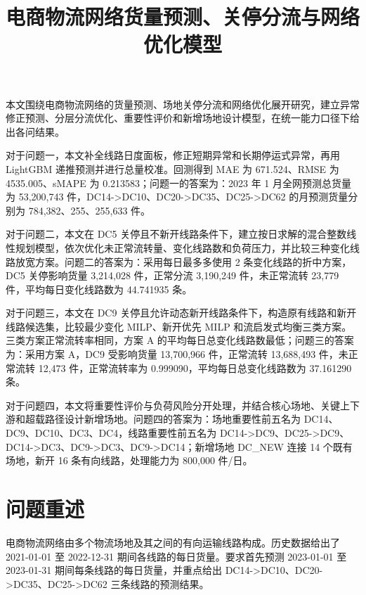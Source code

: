 \documentclass[UTF8,zihao=-4,a4paper,fontset=fandol]{ctexart}
\title{电商物流网络货量预测、关停分流与网络优化模型}
\author{}
\date{}
\begin{document}
\maketitle

\begin{cumcmabstract}
\hspace{2em}本文围绕电商物流网络的货量预测、场地关停分流和网络优化展开研究，建立异常修正预测、分层分流优化、重要性评价和新增场地设计模型，在统一能力口径下给出各问结果。

对于问题一，本文补全线路日度面板，修正短期异常和长期停运式异常，再用 LightGBM 递推预测并进行总量校准。回测得到 MAE 为 671.524、RMSE 为 4535.005、sMAPE 为 0.213583；问题一的答案为：2023 年 1 月全网预测总货量为 53,200,743 件，DC14->DC10、DC20->DC35、DC25->DC62 的月预测货量分别为 784,382、255、255,633 件。

对于问题二，本文在 DC5 关停且不新开线路条件下，建立按日求解的混合整数线性规划模型，依次优化未正常流转量、变化线路数和负荷压力，并比较三种变化线路放宽方案。问题二的答案为：采用每日最多多使用 2 条变化线路的折中方案，DC5 关停影响货量 3,214,028 件，正常分流 3,190,249 件，未正常流转 23,779 件，平均每日变化线路数为 44.741935 条。

对于问题三，本文在 DC9 关停且允许动态新开线路条件下，构造原有线路和新开线路候选集，比较最少变化 MILP、新开优先 MILP 和流启发式均衡三类方案。三类方案正常流转率相同，方案 A 的平均每日总变化线路数最低；问题三的答案为：采用方案 A，DC9 受影响货量 13,700,966 件，正常流转 13,688,493 件，未正常流转 12,473 件，正常流转率为 0.999090，平均每日总变化线路数为 37.161290 条。

对于问题四，本文将重要性评价与负荷风险分开处理，并结合核心场地、关键上下游和超载路径设计新增场地。问题四的答案为：场地重要性前五名为 DC14、DC9、DC10、DC3、DC4，线路重要性前五名为 DC14->DC9、DC25->DC9、DC14->DC3、DC9->DC3、DC9->DC14；新增场地 DC\_NEW 连接 14 个既有场地，新开 16 条有向线路，处理能力为 800,000 件/日。
\end{cumcmabstract}


\CumcmCompactToc

\CumcmBodyStart

\section{问题重述}



电商物流网络由多个物流场地及其之间的有向运输线路构成。历史数据给出了 2021-01-01 至 2022-12-31 期间各线路的每日货量。要求首先预测 2023-01-01 至 2023-01-31 期间每条线路的每日货量，并重点给出 DC14->DC10、DC20->DC35、DC25->DC62 三条线路的预测结果。
\end{document}
